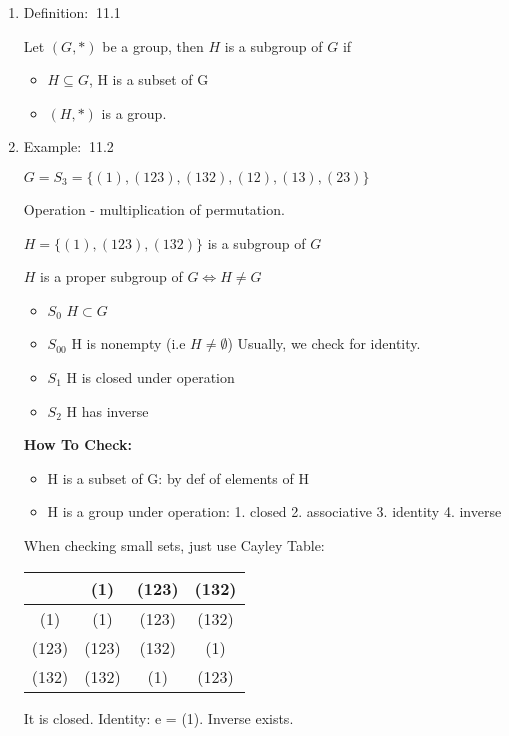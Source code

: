 \documentclass[12pt]{article}
\newcommand{\defi}{{\color{blue} Definition: $\ $}}
\newcommand{\exe}{{\color{green} Example: $\ $}}
\begin{document}
\begin{enumerate}
    \begin{enumerate}
        \item \defi 11.1 
        
        Let $(G, *)$ be a group, then $H$ is a subgroup of $G$ if 
        \begin{itemize}
            \item $H \subseteq G$, H is a subset of G
            \item $(H,*)$ is a group.
        \end{itemize}

        \item \exe 11.2
        
        $G = S_3 = \{(1), (123), (132), (12), (13), (23)\}$

        Operation - multiplication of permutation.

        $H = \{(1), (123), (132)\}$ is a subgroup of $G$

        $H$ is a proper subgroup of $G \Leftrightarrow H \ne G$
        \begin{itemize}
            \item $S_0$ $H\subset G$
            \item $S_{00}$ H is nonempty (i.e $H \ne \emptyset$) Usually, we check for identity.
            \item $S_1$ H is closed under operation
            \item $S_2$ H has inverse
        \end{itemize}
        \textbf{How To Check:}
        \begin{itemize}
            \item H is a subset of G: by def of elements of H
            \item H is a group under operation: 1. closed 2. associative 3. identity 4. inverse
        \end{itemize}

        When checking small sets, just use Cayley Table:

        \begin{tabular}{c|ccc}
            & (1) & (123) & (132) \\ \hline
            (1) & (1) & (123) & (132) \\ 
            (123) & (123) & (132) & (1) \\ 
            (132) & (132) & (1) & (123)
        \end{tabular}
        
        It is closed. Identity: e = (1). Inverse exists.
        

\end{enumerate}
\end{enumerate}
\end{document}
